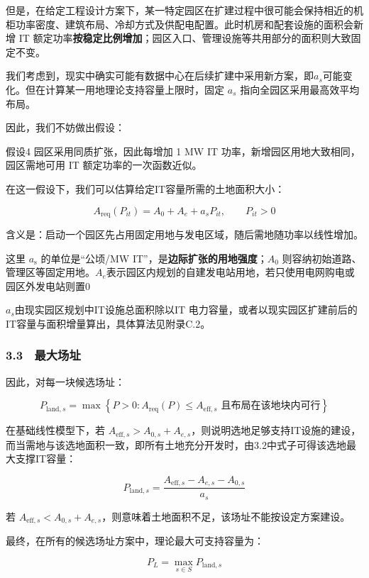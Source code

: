 但是，在给定工程设计方案下，某一特定园区在扩建过程中很可能会保持相近的机柜功率密度、建筑布局、冷却方式及供配电配置。此时机房和配套设施的面积会新增 IT 额定功率\textbf{按稳定比例增加}；园区入口、管理设施等共用部分的面积则大致固定不变。

我们考虑到，现实中确实可能有数据中心在后续扩建中采用新方案，即$a_s$可能变化。但在计算某一用地理论支持容量上限时，固定 $a_s$ 指向全园区采用最高效平均布局。

因此，我们不妨做出假设：

\begin{asum}
假设4 园区采用同质扩张，因此每增加 1 MW IT 功率，新增园区用地大致相同，园区需地可用 IT 额定功率的一次函数近似。
\end{asum}

在这一假设下，我们可以估算给定IT容量所需的土地面积大小：

\[
A_{\mathrm{req}}(P_{it})=A_{0}+A_{e}+a_sP_{it},\qquad P_{it}>0
\]

含义是：启动一个园区先占用固定用地与发电区域，随后需地随功率以线性增加。

这里 $a_{\text{s}}$ 的单位是“公顷/MW IT”，是\textbf{边际扩张的用地强度}；$A_0$ 则容纳初始道路、管理区等固定用地。$A_e$表示园区内规划的自建发电站用地，若只使用电网购电或园区外发电站则置$0$

$a_s$由现实园区规划中IT设施总面积除以IT 电力容量，或者以现实园区扩建前后的IT容量与面积增量算出，具体算法见附录C.2。

\subsubsection{3.3　最大场址}

因此，对每一块候选场址：

\[
P_{\mathrm{land},s}=\max\left\{P>0:A_{\mathrm{req}}(P)\leq A_{\mathrm{eff},s}\text{ 且布局在该地块内可行}\right\}
\]

在基础线性模型下，若 $A_{\mathrm{eff},s}>A_{0,s}+A_{e,s}$，则说明选地足够支持IT设施的建设，而当需地与该选地面积一致，即所有土地充分开发时，由3.2中式子可得该选地最大支撑IT容量：

\[
P_{\mathrm{land},s} =\frac{A_{\mathrm{eff},s}-A_{e,s}-A_{0,s}}{a_s}
\]

若 $A_{\mathrm{eff},s}<A_{0,s}+A_{e,s}$，则意味着土地面积不足，该场址不能按设定方案建设。

最终，在所有的候选场址方案中，理论最大可支持容量为：

\[
P_L=\max_{s\in S}P_{\mathrm{land},s}
\]

